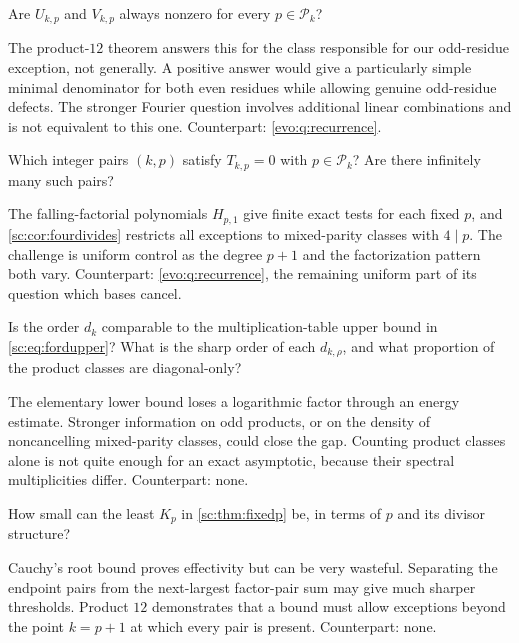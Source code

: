 \documentclass[11pt,a4paper]{article}
\numberwithin{equation}{section}
\theoremstyle{definition}
\theoremstyle{remark}
\begin{document}
\begin{question}\label{sc:q:even}
Are $U_{k,p}$ and $V_{k,p}$ always nonzero for every $p\in\mathcal P_k$?
\end{question}
The product-$12$ theorem answers this for the class responsible for our
odd-residue exception, not generally. A positive answer would give a particularly
simple minimal denominator for both even residues while allowing genuine
odd-residue defects. The stronger Fourier question involves additional
linear combinations and is not equivalent to this one.
Counterpart: \cref{evo:q:recurrence}.

\begin{question}\label{sc:q:odd}
Which integer pairs $(k,p)$ satisfy $T_{k,p}=0$ with $p\in\mathcal P_k$?
Are there infinitely many such pairs?
\end{question}
The falling-factorial polynomials $H_{p,1}$ give finite exact tests for each
fixed $p$, and \cref{sc:cor:fourdivides} restricts all exceptions to
mixed-parity classes with $4\mid p$. The challenge is uniform control as
the degree $p+1$ and the factorization pattern both vary.
Counterpart: \cref{evo:q:recurrence}, the remaining uniform part of its question which bases cancel.

\begin{question}\label{sc:q:scale}
Is the order $d_k$ comparable to the multiplication-table upper bound in
\eqref{sc:eq:fordupper}? What is the sharp order of each $d_{k,\rho}$, and
what proportion of the product classes are diagonal-only?
\end{question}
The elementary lower bound loses a logarithmic factor through an energy
estimate. Stronger information on odd products, or on the density of
noncancelling mixed-parity classes, could close the gap. Counting product
classes alone is not quite enough for an exact asymptotic, because their
spectral multiplicities differ.
Counterpart: none.

\begin{question}\label{sc:q:thresholds}
How small can the least $K_p$ in \cref{sc:thm:fixedp} be, in terms of $p$
and its divisor structure?
\end{question}
Cauchy's root bound proves effectivity but can be very wasteful.
Separating the endpoint pairs from the next-largest factor-pair sum may
give much sharper thresholds. Product $12$ demonstrates that a bound must
allow exceptions beyond the point $k=p+1$ at which every pair is present.
Counterpart: none.
\end{document}
